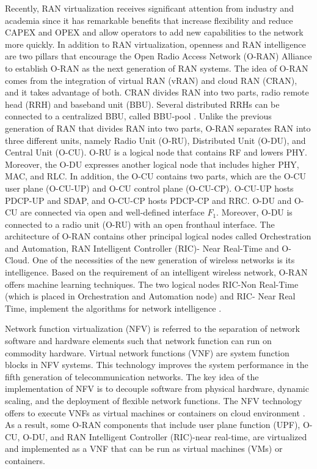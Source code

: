 \documentclass[conference]{IEEEtran}
\begin{document}
Recently, RAN virtualization receives significant attention from industry and academia since it has remarkable benefits that increase flexibility and reduce CAPEX and OPEX and allow operators to add new capabilities to the network more quickly. In addition to RAN virtualization, openness and RAN intelligence are two pillars that encourage the Open Radio Access Network (O-RAN) Alliance to establish O-RAN as the next generation of RAN systems. 
The idea of O-RAN comes from the integration of virtual RAN (vRAN) and cloud RAN (CRAN), and it takes advantage of both. CRAN divides RAN into two parts, radio remote head (RRH) and baseband unit (BBU).  Several distributed RRHs can be connected to a centralized BBU,  called BBU-pool \cite{han2019research}. 
Unlike the previous generation of RAN that divides RAN into two parts, O-RAN separates RAN into three different units, namely Radio Unit (O-RU), Distributed Unit (O-DU), and Central Unit (O-CU). 
O-RU is a logical node that contains RF and lowers PHY. Moreover, the O-DU expresses another logical node that includes higher PHY, MAC, and RLC.
In addition, the O-CU contains two parts, which are the O-CU user plane (O-CU-UP) and O-CU control plane (O-CU-CP). O-CU-UP hosts PDCP-UP and SDAP, and O-CU-CP hosts PDCP-CP and RRC.
O-DU and O-CU are connected via open and well-defined interface $F_1$.
Moreover, O-DU is connected to a radio unit (O-RU) with an open fronthaul interface.
The architecture of O-RAN contains other principal logical nodes called Orchestration and Automation,
RAN Intelligent Controller (RIC)- Near Real-Time and O-Cloud. 
One of the necessities of the new generation of wireless networks is its intelligence.
Based on the requirement of an intelligent wireless network, O-RAN offers machine learning techniques. The two logical nodes RIC-Non Real-Time (which is placed in Orchestration and Automation node) and RIC- Near Real Time, implement the algorithms for network intelligence 
\cite{gavrilovska2020cloud,niknam2020intelligent,kazemifard2021minimum,both2021system,ORANArch,ORANML,lin2021toward}.

Network function virtualization (NFV) is referred to the separation of network software and hardware elements such that network function can run on commodity hardware. Virtual network functions (VNF) are system function blocks in NFV systems. This technology improves the system performance in the fifth generation of telecommunication networks. 
The key idea of the implementation of NFV is to decouple software from physical hardware, dynamic scaling, and the deployment of flexible network functions. The NFV technology offers to execute VNFs as virtual machines or containers on  cloud environment \cite{mijumbi2015network, luo2020online}.
As a result, some O-RAN components that include user plane function (UPF), O-CU, O-DU, and RAN Intelligent Controller (RIC)-near real-time, are virtualized and implemented as a VNF that can be run as virtual machines (VMs) or containers.
\end{document}
